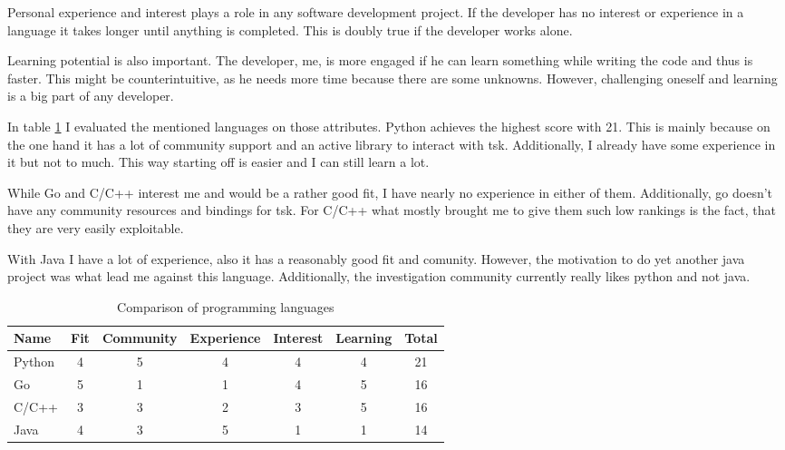 Personal experience and interest plays a role in any software development project. If the developer has no interest or experience in a language it takes longer until anything is completed. This is doubly true if the developer works alone. 

Learning potential is also important. The developer, me, is more engaged if he can learn something while writing the code and thus is faster. This might be counterintuitive, as he needs more time because there are some unknowns. However, challenging oneself and learning is a big part of any developer.

In table \ref{tab:dec:language} I evaluated the mentioned languages on those attributes. Python achieves the highest score with 21. This is mainly because on the one hand it has a lot of community support and an active library to interact with \gls{tsk}. Additionally, I already have some experience in it but not to much. This way starting off is easier and I can still learn a lot. 

While Go and C/C++ interest me and would be a rather good fit, I have nearly no experience in either of them. Additionally, go doesn't have any community resources and bindings for \gls{tsk}. For C/C++ what mostly brought me to give them such low rankings is the fact, that they are very easily exploitable. 

With Java I have a lot of experience, also it has a reasonably good fit and comunity. However, the motivation to do yet another java project was what lead me against this language. Additionally, the investigation community currently really likes python and not java.

\begin{table}[!ht]
    \begin{center}
        \caption{Comparison of programming languages}
        \label{tab:dec:language}
        \begin{tabular}{l|c|c|c|c|c|c}
            \textbf{Name} & \textbf{Fit} & \textbf{Community} & \textbf{Experience} & \textbf{Interest} & \textbf{Learning} & \textbf{Total}\\
        \hline
            Python  & 4 & 5 & 4 & 4 & 4 & 21 \\
            Go      & 5 & 1 & 1 & 4 & 5 & 16 \\
            C/C++   & 3 & 3 & 2 & 3 & 5 & 16 \\
            Java    & 4 & 3 & 5 & 1 & 1 & 14 \\
        \end{tabular}
    \end{center}
\end{table}



